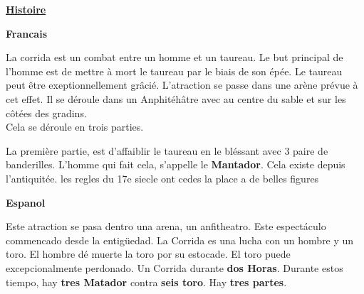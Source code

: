 \documentclass[12pt,a4paper]{article}
\begin{document}
\begin{center}
        \shadowbox{\begin{large}
                \textcolor{black}{La Corrida}
        \end{large}}
    \end{center}
    \vspace{0.5 cm}
		\begin{presentation}
	\color{blue}	
	\noindent		\textbf{\underline{Histoire}}	\par
	\color{red}	
\textbf{	Francais} \par
					La corrida est un combat entre un homme et un taureau.
					Le but principal de l'homme est de mettre \`a mort le taureau par le biais de son \'ep\'ee.
					Le taureau peut \^etre exeptionnellement gr\^aci\'e.
					L'atraction se passe dans une ar\`ene pr\'evue \`a cet effet.
					Il se déroule dans un Anphitéhâtre avec au centre du sable et sur les côtées des gradins. \\
					Cela se d\'eroule en trois parties.\par 
				La premi\`ere partie, est d'affaiblir le taureau en le bl\'essant avec 3 paire de banderilles.
					L'homme qui fait cela, s'appelle le \textbf{Mantador}.
	 				Cela existe depuis l'antiquitée.
				les regles du 17e siecle ont cedes la place a de belles figures \par
		
	\color{black}	
\textbf{Espanol} \par
	Este atraction se pasa dentro una arena, un anfitheatro.
	Este espect\'aculo commencado desde la entig\"uedad.
	La Corrida es una lucha con un hombre y un toro. 
	El hombre dé muerte la toro por su estocade.
	El toro puede excepcionalmente perdonado.
	Un Corrida durante \textbf{dos Horas}.
	Durante estos tiempo, hay \textbf{tres Matador} contra \textbf{seis toro}.
	Hay \textbf{tres partes}.\\ 


		\end{presentation}
\end{document}
